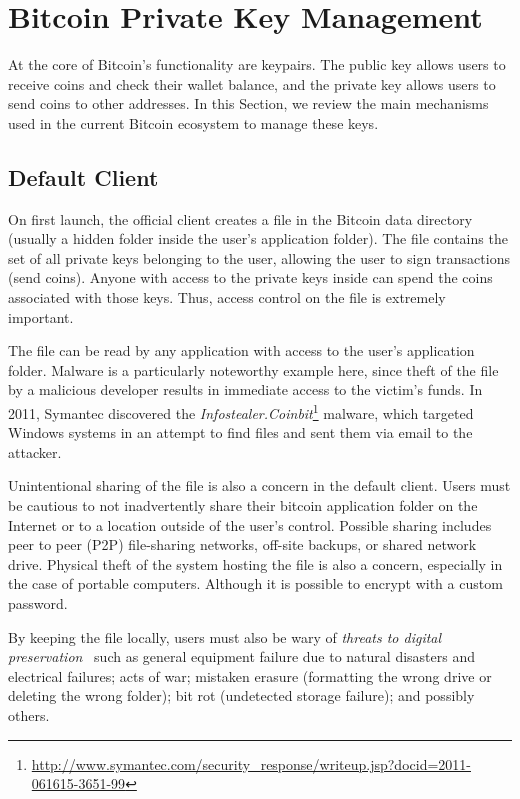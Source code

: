 
\section{Bitcoin Private Key Management}
At the core of Bitcoin's functionality are keypairs. The public key allows users to receive coins and check their wallet balance, and the private key allows users to send coins to other addresses. In this Section, we review the main mechanisms used in the current Bitcoin ecosystem to manage these keys.

\subsection{Default Client}
On first launch, the official \bitcoinclient client creates a \walletfile file in the Bitcoin data directory (usually a hidden folder inside the user's application folder). The \walletfile file contains the set of all private keys belonging to the user, allowing the user to sign transactions (\ie send coins). Anyone with access to the private keys inside \walletfile can spend the coins associated with those keys. Thus, access control on the \walletfile file is extremely important. 

The \walletfile file can be read by any application with access to the user's application folder. Malware is a particularly noteworthy example here, since theft of the \walletfile file by a malicious developer results in immediate access to the victim's funds. In 2011, Symantec discovered the \textit{Infostealer.Coinbit}\footnote{\url{http://www.symantec.com/security_response/writeup.jsp?docid=2011-061615-3651-99}} malware, which targeted Windows systems in an attempt to find \walletfile files and sent them via email to the attacker. 

Unintentional sharing of the \walletfile file is also a concern in the default client. Users must be cautious to not inadvertently share their bitcoin application folder on the Internet or to a location outside of the user's control. Possible sharing includes peer to peer (P2P) file-sharing networks, off-site backups, or shared network drive. Physical theft of the system hosting the \walletfile file is also a concern, especially in the case of portable computers. Although it is possible to encrypt \walletfile with a custom password.

By keeping the \walletfile file locally, users must also be wary of \textit{threats to digital preservation}~\cite{BKM05} such as general equipment failure due to natural disasters and electrical failures; acts of war; mistaken erasure (\eg formatting the wrong drive or deleting the wrong folder); bit rot (\ie undetected storage failure); and possibly others. 

